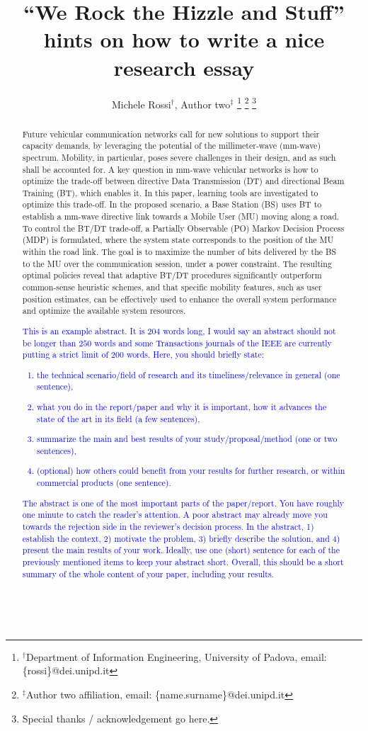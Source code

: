 \documentclass[10pt, conference, letterpaper]{IEEEtran}
\title{``We Rock the Hizzle and Stuff'' \\ hints on how to write a nice research essay}
\author{Michele Rossi$^\dag$, Author two$^\ddag$
\thanks{$^\dag$Department of Information Engineering, University of Padova, email: \{rossi\}@dei.unipd.it}
\thanks{$^\ddag$Author two affiliation, email: \{name.surname\}@dei.unipd.it}
\thanks{Special thanks / acknowledgement go here.}
}
\newcommand\MR[1]{\textcolor{blue}{#1}}
\begin{document}
\maketitle

\begin{abstract}
Future vehicular communication networks call for new solutions to support their capacity demands, by leveraging the potential of the \mbox{millimeter-wave} (\mbox{mm-wave}) spectrum. Mobility, in particular, poses severe challenges in their design, and as such shall be accounted for. A key question in \mbox{mm-wave} vehicular networks is how to optimize the \mbox{trade-off} between directive Data Transmission (DT) and directional Beam Training (BT), which enables it. In this paper, learning tools are investigated to optimize this \mbox{trade-off}. In the proposed scenario, a Base Station (BS) uses BT to establish a \mbox{mm-wave} directive link towards a Mobile User (MU) moving along a road. To control the BT/DT \mbox{trade-off}, a Partially Observable (PO) Markov Decision Process (MDP) is formulated, where the system state corresponds to the position of the MU within the road link. The goal is to maximize the number of bits delivered by the BS to the MU over the communication session, under a power constraint. The resulting optimal policies reveal that adaptive BT/DT procedures significantly outperform \mbox{common-sense} heuristic schemes, and that specific mobility features, such as user position estimates, can be effectively used to enhance the overall system performance and optimize the available system resources.\\ 

\MR{This is an example abstract. It is $204$ words long, I would say an abstract should not be longer than $250$ words and some Transactions journals of the IEEE are currently putting a strict limit of $200$ words. Here, you should briefly state: 
\begin{enumerate}
\item the technical scenario/field of research and its timeliness/relevance in general (one sentence),
\item what you do in the report/paper and why it is important, how it advances the state of the art in its field (a few sentences), 
\item summarize the main and best results of your study/proposal/method (one or two sentences),
\item (optional) how others could benefit from your results for further research, or within commercial products (one sentence).
\end{enumerate}  
The abstract is one of the most important parts of the paper/report. You have roughly one minute to catch the reader's attention. A poor abstract may already move you towards the rejection side in the reviewer's decision process. In the abstract, 1) establish the context, 2) motivate the problem, 3) briefly describe the solution, and 4) present the main results of your work. Ideally, use one (short) sentence for each of the previously mentioned items to keep your abstract short. Overall, this should be a short summary of the whole content of your paper, including your results.}\\


\end{abstract}
\end{document}
